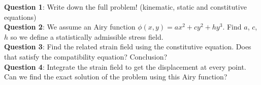 \noindent \textbf{Question 1}: Write down the full problem! (kinematic, static and constitutive equations) \\

\noindent \textbf{Question 2}: We assume an Airy function $\phi(x,y) = ax^2 + cy^2 + h y^3$. Find $a$, $c$, $h$ so we define a statistically admissible stress field. \\

\noindent \textbf{Question 3}: Find the related strain field using the constitutive equation. Does that satisfy the compatibility equation? Conclusion? \\

\noindent \textbf{Question 4}: Integrate the strain field to get the displacement at every point. Can we find the exact solution of the problem using this Airy function?
